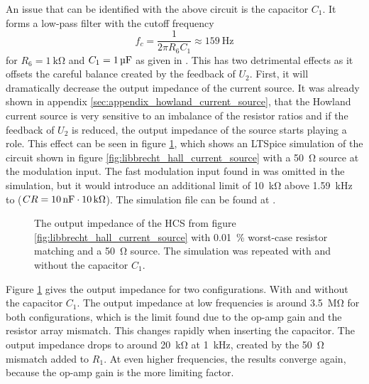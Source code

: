 An issue that can be identified with the above circuit is the capacitor $C_1$. It forms a low-pass filter with the cutoff frequency
\begin{equation*}
    f_c = \frac{1}{2 \pi R_6 C_1} \approx \qty{159}{\Hz}
\end{equation*}
for $R_6 = \qty{1}{\kilo\ohm}$ and $C_1 = \qty{1}{\uF}$ as given in \cite{laser_driver_digital,libbrecht_hall}. This has two detrimental effects as it offsets the careful balance created by the feedback of $U_2$. First, it will dramatically decrease the output impedance of the current source. It was already shown in appendix \ref{sec:appendix_howland_current_source}, that the Howland current source is very sensitive to an imbalance of the resistor ratios and if the feedback of $U_2$ is reduced, the output impedance of the source starts playing a role. This effect can be seen in figure \ref{fig:output_impedance_libbrecht_hall}, which shows an LTSpice simulation of the circuit shown in figure \ref{fig:libbrecht_hall_current_source} with a \qty{50}{\ohm} source at the modulation input. The fast modulation input found in \cite{libbrecht_hall} was omitted in the simulation, but it would introduce an additional limit of \qty{10}{\kilo\ohm} above \qty{1.59}{\kHz} to ($CR=\qty{10}{\nF} \cdot \qty{10}{\kilo\ohm}$). The simulation file can be found at .
\begin{figure}[hb]
    \centering
    
    \caption{The output impedance of the HCS from figure \ref{fig:libbrecht_hall_current_source} with \qty{0.01}{\percent} worst-case resistor matching and a \qty{50}{\ohm} source. The simulation was repeated with and without the capacitor $C_1$.}
    \label{fig:output_impedance_libbrecht_hall}
\end{figure}

Figure \ref{fig:output_impedance_libbrecht_hall} gives the output impedance for two configurations. With and without the capacitor $C_1$. The output impedance at low frequencies is around \qty{3.5}{\mega\ohm} for both configurations, which is the limit found due to the op-amp gain and the resistor array mismatch. This changes rapidly when inserting the capacitor. The output impedance drops to around \qty{20}{\kilo\ohm} at \qty{1}{\kHz}, created by the \qty{50}{\ohm} mismatch added to $R_1$. At even higher frequencies, the results converge again, because the op-amp gain is the more limiting factor.

